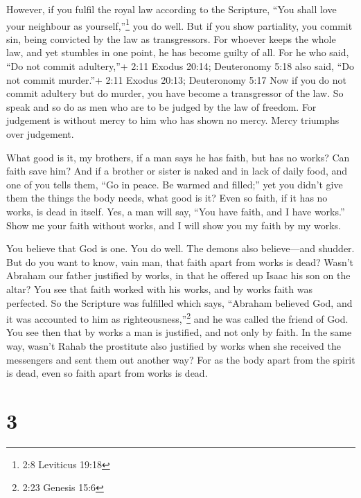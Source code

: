  However, if you fulfil the royal law according to the
Scripture, ``You shall love your neighbour as yourself,''\footnote{2:8
  Leviticus 19:18} you do well.  But if you show partiality,
you commit sin, being convicted by the law as transgressors.
 For whoever keeps the whole law, and yet stumbles in one
point, he has become guilty of all.  For he who said, ``Do
not commit adultery,''+ 2:11 Exodus 20:14; Deuteronomy 5:18 also said,
``Do not commit murder.''+ 2:11 Exodus 20:13; Deuteronomy 5:17 Now if
you do not commit adultery but do murder, you have become a transgressor
of the law.  So speak and so do as men who are to be judged
by the law of freedom.  For judgement is without mercy to
him who has shown no mercy. Mercy triumphs over judgement.

 What good is it, my brothers, if a man says he has faith,
but has no works? Can faith save him?  And if a brother or
sister is naked and in lack of daily food,  and one of you
tells them, ``Go in peace. Be warmed and filled;'' yet you didn't give
them the things the body needs, what good is it?  Even so
faith, if it has no works, is dead in itself.  Yes, a man
will say, ``You have faith, and I have works.'' Show me your faith
without works, and I will show you my faith by my works.

 You believe that God is one. You do well. The demons also
believe---and shudder.  But do you want to know, vain man,
that faith apart from works is dead?  Wasn't Abraham our
father justified by works, in that he offered up Isaac his son on the
altar?  You see that faith worked with his works, and by
works faith was perfected.  So the Scripture was fulfilled
which says, ``Abraham believed God, and it was accounted to him as
righteousness,''\footnote{2:23 Genesis 15:6} and he was called the
friend of God.  You see then that by works a man is
justified, and not only by faith.  In the same way, wasn't
Rahab the prostitute also justified by works when she received the
messengers and sent them out another way?  For as the body
apart from the spirit is dead, even so faith apart from works is dead.

\hypertarget{section-2}{%
\section{3}\label{section-2}}

